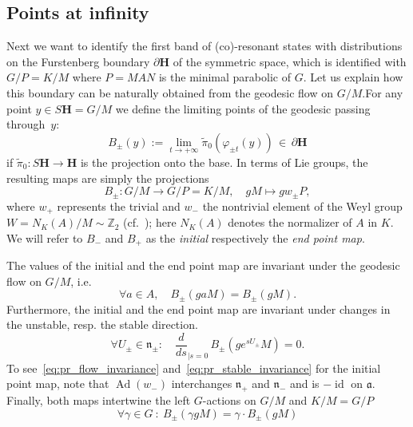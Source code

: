 \documentclass[AHL, Unicode, longabstracts, published]{cedram}
\DeclareMathOperator{\id}{id}
\DeclareMathOperator{\Ad}{Ad}
\newcommand{\bfh}{\mathbf{H}}
\newcommand{\pl}{\partial}
\newcommand{\til}{\widetilde}
\newcommand{\Z}{\mathbb Z}
\newcommand{\n}{\mathfrak n}
\let\oldforall\forall
\renewcommand*{\forall}{\mathrel{\oldforall}}
\begin{document}
\subsection{Points at infinity}
Next we want to identify the first band of (co)-resonant states with distributions on the Furstenberg boundary $\pl{\bfh}$ of the symmetric space, which is identified with $G/P=K/M$ where $P=MAN$ is the minimal parabolic of $G$. Let us explain how this boundary can be naturally obtained from the geodesic flow on $G/M$.\linebreak For any point $y\in S{\bfh}=G/M$ we define the limiting points of the geodesic passing through~$y$:
\[
B_\pm(y):=\lim_{t\to +\infty}\til\pi_0(\varphi_{\pm t}(y))\,\in\,\pl{\bfh}
\]
if $\til\pi_0:S{\bfh}\to {\bfh}$ is the projection onto the base. In terms of Lie groups, the resulting maps are simply the projections
\begin{equation}\label{eq:initial_end_point_map}
B_\pm\colon G/M \to G/P=K/M,\quad gM\mapsto gw_\pm P,
\end{equation}
where $w_+$ represents the trivial and $w_-$ the nontrivial element of the Weyl group\linebreak$W=N_K(A)/M\sim \Z_2$ (cf.~\cite{DFG15,Hi05,HHS12}); here $N_K(A)$ denotes the normalizer of $A$ in $K$. We will refer to $B_-$ and $B_+$ as the \emph{initial} respectively the \emph{end point map}.


\begin{rema}\label{lem:projection_properties}
The values of the initial and the end point map are invariant under the geodesic flow on $G/M$, i.e.
\begin{equation}\label{eq:pr_flow_invariance}
\forall a\in A, \quad B_{\pm}(gaM)=B_{\pm}(gM).
\end{equation}
Furthermore, the initial and the end point map are invariant under changes in the unstable, resp. the stable direction.
\begin{equation}\label{eq:pr_stable_invariance}
\forall U_\pm\in \n_\pm :\quad \frac{d}{ds}_{|s=0}\,B_\pm \left(ge^{s U_\pm}M\right)=0.
\end{equation}
To see~\eqref{eq:pr_flow_invariance} and~\eqref{eq:pr_stable_invariance} for the initial point map, note that $\Ad(w_-)$ interchanges $\n_+$ and $\n_-$ and is $-\id$ on $\mathfrak a$. Finally, both maps intertwine the left $G$-actions on $G/M$ and $K/M=G/P$
\begin{equation}\label{eq:pr_intertwining}
\forall \gamma\in G~:~B_\pm(\gamma gM) = \gamma\cdot B_\pm(gM)
\end{equation}
\end{rema}
\end{document}
